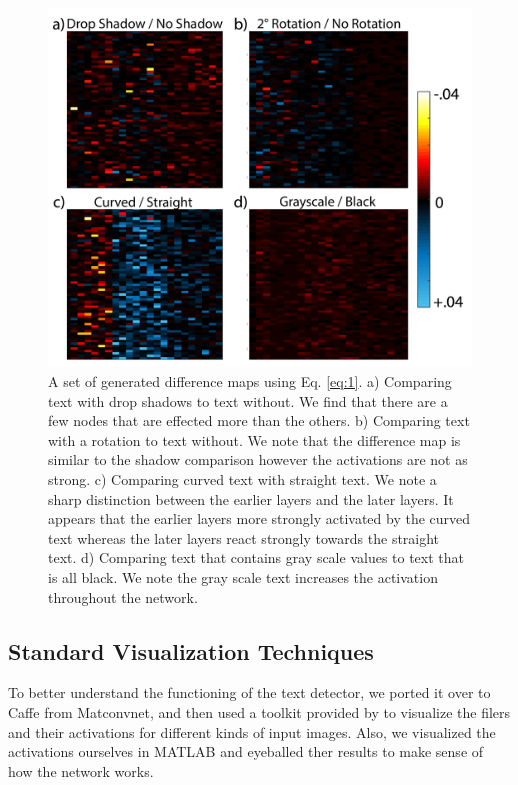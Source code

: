 \documentclass[10pt,twocolumn,letterpaper]{article}
\begin{document}
\begin{figure}
\includegraphics[width=\columnwidth]{Figures/diff_examples/diff_examples-01.png}
\caption{A set of generated difference maps using Eq. \ref{eq:1}. a) Comparing text with drop shadows to text without. We find that there are a few nodes that are effected more than the others. b) Comparing text with a rotation to text without. We note that the difference map is similar to the shadow comparison however the activations are not as strong. c) Comparing curved text with straight text. We note a sharp distinction between the earlier layers and the later layers. It appears that the earlier layers more strongly activated by the curved text whereas the later layers react strongly towards the straight text. d) Comparing text that contains gray scale values to text that is all black. We note the gray scale text increases the activation throughout the network.}
\label{fig:diffexamples}
\end{figure}

\subsection{Standard Visualization Techniques}
To better understand the functioning of the text detector, we ported it over to Caffe from Matconvnet, and then used a toolkit provided by \cite{yosinski2015understanding} to visualize the filers and their activations for different kinds of input images. Also, we visualized the activations ourselves in MATLAB and eyeballed ther results to make sense of how the network works.
\end{document}
